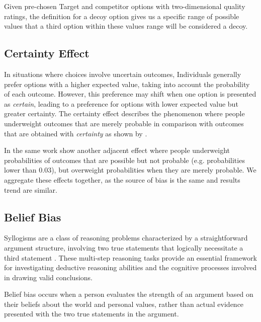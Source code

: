 Given pre-chosen Target and competitor options with two-dimensional quality ratings, the definition for a decoy option gives us a specific range of possible values that a third option within these values range will be considered a decoy.

\subsection{Certainty Effect}
In situations where choices involve uncertain outcomes,  Individuals generally prefer options with a higher expected value, taking into account the probability of each outcome. 
However, this preference may shift when one option is presented as \textit{certain}, leading to a preference for options with lower expected value but greater certainty.
The certainty effect describes the phenomenon where people underweight outcomes that are merely probable in comparison with outcomes that are obtained with \textit{certainty} as shown by \cite{Kahneman1979ProspectTA}.

In the same work \citet{Kahneman1979ProspectTA} show another adjacent effect where people underweight probabilities of outcomes that are possible but not probable (e.g. probabilities lower than 0.03), but overweight probabilities when they are merely probable.
We aggregate these effects together, as the source of bias is the same and results trend are similar.

\subsection{Belief Bias}
Syllogisms are a class of reasoning problems characterized by a straightforward argument structure, involving two true statements that logically necessitate a third statement \cite{smith2000aristotle}. 
These multi-step reasoning tasks provide an essential framework for investigating deductive reasoning abilities and the cognitive processes involved in drawing valid conclusions.

Belief bias occurs when a person evaluates the strength of an argument based on their beliefs about the world and personal values, rather than actual evidence presented with the two true statements in the argument.

